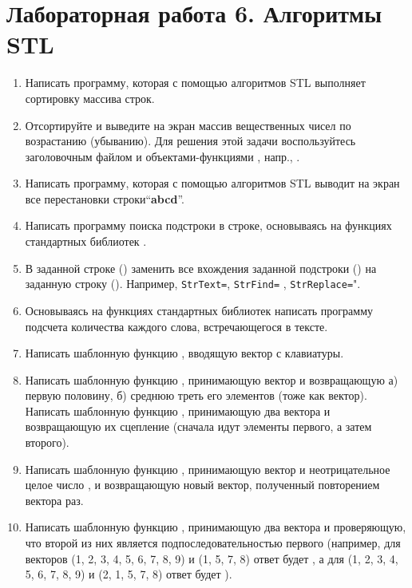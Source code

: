 \section{Лабораторная работа 6. Алгоритмы STL}
\begin{enumerate}[leftmargin=*]
    \item Написать программу, которая с помощью алгоритмов STL \monobf{[sort()]} выполняет сортировку массива строк.
    \item Отсортируйте и выведите на экран массив вещественных чисел по возрастанию (убыванию). Для решения этой задачи воспользуйтесь заголовочным файлом  и объектами-функциями , напр., .
    \item Написать программу, которая с помощью алгоритмов STL  выводит на экран все перестановки строки“\textbf{abcd}”.
    \item Написать программу поиска подстроки в строке, основываясь на функциях стандартных библиотек \monobf{[find()]}.
    \item В заданной строке () заменить все вхождения заданной подстроки () на заданную строку (). Например, \texttt{StrText=}, \texttt{StrFind=} , \texttt{StrReplace=}".
    \item Основываясь на функциях стандартных библиотек написать программу подсчета количества каждого слова, встречающегося в тексте.
    \item Написать шаблонную функцию , вводящую вектор с клавиатуры.
    \item Написать шаблонную функцию , принимающую вектор и возвращающую а) первую половину, б) среднюю треть его элементов (тоже как вектор).
    Написать шаблонную функцию , принимающую два вектора и возвращающую их сцепление (сначала идут элементы первого, а затем второго).
    \item Написать шаблонную функцию , принимающую вектор  и неотрицательное целое число , и возвращающую новый вектор, полученный повторением вектора  раз.
    \item Написать шаблонную функцию , принимающую два вектора и проверяющую, что второй из них является подпоследовательностью первого (например, для векторов (1, 2, 3, 4, 5, 6, 7, 8, 9) и (1, 5, 7, 8) ответ будет , а для (1, 2, 3, 4, 5, 6, 7, 8, 9) и (2, 1, 5, 7, 8) ответ будет ).

\end{enumerate}
